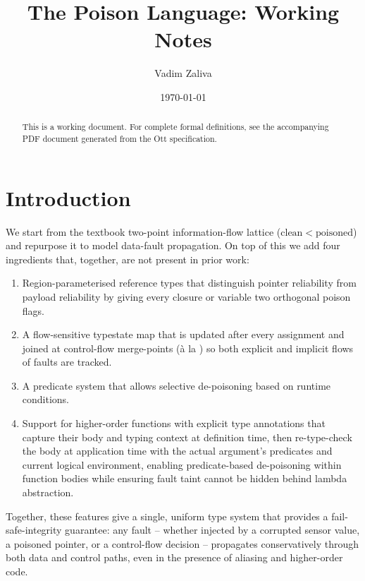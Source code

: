 \documentclass[12pt]{article}
\title{The Poison Language: Working Notes}
\author{Vadim Zaliva}
\date{\today}
\begin{document}
\maketitle

\begin{abstract}
    This is a working document. For complete formal definitions, see the
    accompanying PDF document generated from the Ott specification.
\end{abstract}

\tableofcontents

\sloppy

\section{Introduction}
\label{sec:introduction}

We start from the textbook two-point information-flow lattice
($\mathrm{clean} < \mathrm{poisoned}$) and repurpose it to model data-fault
propagation. On top of this we add four ingredients that,
together, are not present in prior work:
\begin{enumerate}
    \item Region-parameterised reference types that distinguish pointer
    reliability from payload reliability by giving every closure or
    variable two orthogonal poison flags.
    \item A flow-sensitive typestate map that is updated after every assignment
    and joined at control-flow merge-points (à la \cite{DBLP:conf/popl/HuntS06})
    so both explicit and implicit flows of faults are tracked.
    \item A predicate system that allows selective de-poisoning based on runtime
    conditions.
    \item Support for higher-order functions with explicit type annotations that capture their body and typing
    context at definition time, then re-type-check the body at application time with the actual argument's
    predicates and current logical environment, enabling predicate-based
    de-poisoning within function bodies while ensuring fault taint cannot be
    hidden behind lambda abstraction.
\end{enumerate}

Together, these features give a single, uniform type system that provides a
fail-safe-integrity guarantee: any fault -- whether injected by a corrupted
sensor value, a poisoned pointer, or a control-flow decision -- propagates
conservatively through both data and control paths, even in the presence of
aliasing and higher-order code.
\end{document}
